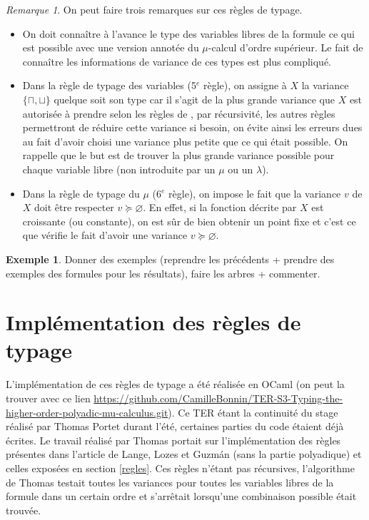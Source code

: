 \documentclass{rapport}
\theoremstyle{plain}
\theoremstyle{remark}
\newtheorem{rema}{Remarque}
\theoremstyle{definition}
\newtheorem{exem}{Exemple}
\begin{document}
\begin{rema} On peut faire trois remarques sur ces règles de typage. 
\begin{itemize}
	\item On doit connaître à l'avance le type des variables libres de la formule ce qui est possible avec une version annotée du $\mu$-calcul d'ordre supérieur. Le fait de connaître les informations de variance de ces types est plus compliqué. 
	\item Dans la règle de typage des variables (5$^e$ règle), on assigne à $X$ la variance $\{\sqcap, \sqcup\}$ quelque soit son type car il s'agit de la plus grande variance que $X$ est autorisée à prendre selon les règles de \citep{lange2014model}, par récursivité, les autres règles permettront de réduire cette variance si besoin, on évite ainsi les erreurs dues au fait d'avoir choisi une variance plus petite que ce qui était possible. On rappelle que le but est de trouver la plus grande variance possible pour chaque variable libre (non introduite par un $\mu$ ou un $\lambda$). 
	\item Dans la règle de typage du $\mu$ (6$^e$ règle), on impose le fait que la variance $v$ de $X$ doit être respecter $v \succcurlyeq \varnothing$. En effet, si la fonction décrite par $X$ est croissante (ou constante), on est sûr de bien obtenir un point fixe et c'est ce que vérifie le fait d'avoir une variance $v \succcurlyeq \varnothing$.
\end{itemize}
\end{rema}

\begin{exem}
Donner des exemples (reprendre les précédents + prendre des exemples des formules pour les résultats), faire les arbres + commenter.
\end{exem}

\section{Implémentation des règles de typage\label{algos}}

L'implémentation de ces règles de typage a été réalisée en OCaml (on peut la trouver avec ce lien \url{https://github.com/CamilleBonnin/TER-S3-Typing-the-higher-order-polyadic-mu-calculus.git}). Ce TER étant la continuité du stage réalisé par Thomas Portet durant l'été, certaines parties du code étaient déjà écrites. Le travail réalisé par Thomas portait sur l'implémentation des règles présentes dans l'article de Lange, Lozes et Guzm{\'a}n \citep{lange2014model} (sans la partie polyadique) et celles exposées en section \ref{regles}. Ces règles n'étant pas récursives, l'algorithme de Thomas testait toutes les variances pour toutes les variables libres de la formule dans un certain ordre et s'arrêtait lorsqu'une combinaison possible était trouvée. 
\end{document}
